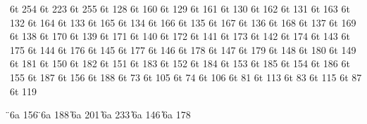 \characterdef \cyryu        6t  254
\characterdef \CYRYA        6t  223
\characterdef \cyrya        6t  255
\characterdef \CYRGDSCHCRS  6t  128
\characterdef \cyrgdschcrs  6t  160
\characterdef \CYRGHCRS     6t  129
\characterdef \cyrghcrs     6t  161
\characterdef \CYRGDSC      6t  130
\characterdef \cyrgdsc      6t  162
\characterdef \CYRGHK       6t  131
\characterdef \cyrghk       6t  163
\characterdef \CYRSHHA      6t  132
\characterdef \cyrshha      6t  164
\characterdef \CYRZHDSC     6t  133
\characterdef \cyrzhdsc     6t  165
\characterdef \CYRDELTA     6t  134
\characterdef \cyrdelta     6t  166
\characterdef \CYRABHDZE    6t  135
\characterdef \cyrabhdze    6t  167
\characterdef \CYRLJE       6t  136
\characterdef \cyrlje       6t  168
\characterdef \CYRKDSC      6t  137
\characterdef \cyrkdsc      6t  169
\characterdef \CYRLDSC      6t  138
\characterdef \cyrldsc      6t  170
\characterdef \CYRKHK       6t  139
\characterdef \cyrkhk       6t  171
\characterdef \CYRLHK       6t  140
\characterdef \cyrlhk       6t  172
\characterdef \CYRNDSC      6t  141
\characterdef \cyrndsc      6t  173
\characterdef \CYRNG        6t  142
\characterdef \cyrng        6t  174
\characterdef \CYRNHK       6t  143
\characterdef \cyrnhk       6t  175
\characterdef \CYROTLD      6t  144
\characterdef \cyrotld      6t  176
\characterdef \CYRSACRS     6t  145
\characterdef \cyrsacrs     6t  177
\characterdef \CYRUSHRT     6t  146
\characterdef \cyrushrt     6t  178
\characterdef \CYRY         6t  147
\characterdef \cyry         6t  179
\characterdef \CYRHHCRS     6t  148
\characterdef \cyrhhcrs     6t  180
\characterdef \CYRHDSC      6t  149
\characterdef \cyrhdsc      6t  181
\characterdef \CYRHHK       6t  150
\characterdef \cyrhhk       6t  182
\characterdef \CYRCHLDSC    6t  151
\characterdef \cyrchldsc    6t  183
\characterdef \CYRCHRDSC    6t  152
\characterdef \cyrchrdsc    6t  184
\characterdef \CYRNJE       6t  153
\characterdef \cyrnje       6t  185
\characterdef \CYRSCHWA     6t  154
\characterdef \cyrschwa     6t  186
\characterdef \CYREPS       6t  155
\characterdef \cyreps       6t  187
\characterdef \CYRYO        6t  156
\characterdef \cyryo        6t  188
\characterdef \CYRII        6t  73
\characterdef \cyrii        6t  105
\characterdef \CYRJE        6t  74
\characterdef \cyrje        6t  106
\characterdef \CYRQ         6t  81
\characterdef \cyrq         6t  113
\characterdef \CYRDZE       6t  83
\characterdef \cyrdze       6t  115
\characterdef \CYRW         6t  87
\characterdef \cyrw         6t  119

\accentdef \"  \CYRE   6a  156
\accentdef \"  \cyre   6a  188
\accentdef \U  \CYRI   6a  201
\accentdef \U  \cyri   6a  233
\accentdef \U  \CYRU   6a  146
\accentdef \U  \cyru   6a  178

